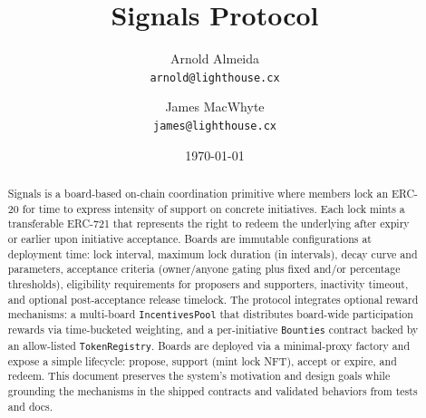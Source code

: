 \documentclass[11pt]{article}
\title{Signals Protocol}
\author{Arnold Almeida \\ \texttt{arnold@lighthouse.cx} \and James MacWhyte \\ \texttt{james@lighthouse.cx}}
\date{\today}
\begin{document}
\maketitle

\begin{abstract}
Signals is a board-based on-chain coordination primitive where members lock an ERC-20 for time to express intensity of support on concrete initiatives. Each lock mints a transferable ERC-721 that represents the right to redeem the underlying after expiry or earlier upon initiative acceptance. Boards are immutable configurations at deployment time: lock interval, maximum lock duration (in intervals), decay curve and parameters, acceptance criteria (owner/anyone gating plus fixed and/or percentage thresholds), eligibility requirements for proposers and supporters, inactivity timeout, and optional post-acceptance release timelock. The protocol integrates optional reward mechanisms: a multi-board \texttt{IncentivesPool} that distributes board-wide participation rewards via time-bucketed weighting, and a per-initiative \texttt{Bounties} contract backed by an allow-listed \texttt{TokenRegistry}. Boards are deployed via a minimal-proxy factory and expose a simple lifecycle: propose, support (mint lock NFT), accept or expire, and redeem. This document preserves the system's motivation and design goals while grounding the mechanisms in the shipped contracts and validated behaviors from tests and docs.
\end{abstract}










\end{document}
